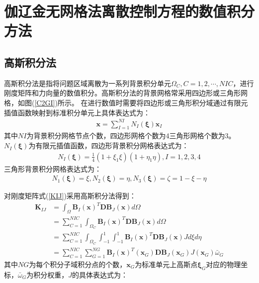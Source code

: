 \section{伽辽金无网格法离散控制方程的数值积分方法}
\subsection{高斯积分法}
高斯积分法是指将问题区域离散为一系列背景积分单元$\Omega_C,C=1,2,\dotsb,N\!I\!C$，进行刚度矩阵和力向量的数值积分。高斯积分法的背景网格常采用四边形或三角形网格，如图(\ref{C2GI})所示。
在进行数值时需要将四边形或三角形积分域通过有限元插值函数映射到标准积分单元上具体表达式为：
\begin{equation}
\begin{split}
    \pmb{x}=\sum_{I=1}^{N\!I}N_I(\pmb{\xi})\pmb{x}_I
\end{split}
\end{equation}
其中$N\!I$为背景积分网格节点个数，四边形网格个数为4三角形网格个数为3。$N_I(\pmb{\xi})$为有限元插值函数，四边形背景积分网格表达式为：
\begin{equation}
\begin{split}
    N_I(\pmb{\xi})=\frac{1}{4}(1+\xi_1\xi)(1+\eta_1\eta),I=1,2,3,4
\end{split}
\end{equation}
三角形背景积分网格表达式为：
\begin{equation}
\begin{split}
    N_1(\pmb{\xi})=\xi,N_2(\pmb{\xi})=\eta,N_3(\pmb{\xi})=\zeta=1-\xi-\eta    
\end{split}
\end{equation}\par
对刚度矩阵式(\ref{KIJ})采用高斯积分法得到：
\begin{equation}
\begin{split}
    \pmb{K}_{IJ}&=\int_{\Omega}\pmb{B}_I(\pmb{x})^T\pmb{D}\pmb{B}_J(\pmb{x})d\Omega\\
     &=\sum_{C=1}^{N\!I\!C}\int_{\Omega_C}\pmb{B}_I(\pmb{x})^T\pmb{D}\pmb{B}_J(\pmb{x})d\Omega\\
     &=\sum_{C=1}^{N\!I\!C}\int_{\Omega_C}\int_{-1}^1\int_{-1}^1\pmb{B}_I(\pmb{x})^T\pmb{D}\pmb{B}_J(\pmb{x})Jd\xi d\eta\\
     &=\sum_{C=1}^{N\!I\!C}\sum_{G=1}^{N\!G}\pmb{B}_I(\pmb{x})^T(\pmb{x}_G)\pmb{D}\pmb{B}_J(\pmb{x}_G)J(\pmb{x}_G)\bar{\omega}_G
\end{split}
\end{equation}
其中$N\!G$为每个积分子域积分点的个数，$\pmb{x}_G$为标准单元上高斯点$\pmb{\xi}_G$对应的物理坐标，$\bar{\omega}_G$为积分权重，$J$的具体表达式为：
